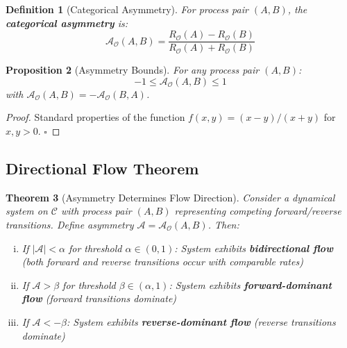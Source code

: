 \documentclass[12pt,a4paper]{article}
\newtheorem{theorem}{Theorem}[section]
\newtheorem{proposition}[theorem]{Proposition}
\newtheorem{definition}[theorem]{Definition}
\begin{document}
\begin{definition}[Categorical Asymmetry]
\label{def:asymmetry}
For process pair $(A, B)$, the \textbf{categorical asymmetry} is:
\begin{equation}
\mathcal{A}_{\mathcal{O}}(A, B) = \frac{R_{\mathcal{O}}(A) - R_{\mathcal{O}}(B)}{R_{\mathcal{O}}(A) + R_{\mathcal{O}}(B)}
\end{equation}
\end{definition}

\begin{proposition}[Asymmetry Bounds]
\label{prop:asymmetry_bounds}
For any process pair $(A, B)$:
\begin{equation}
-1 \leq \mathcal{A}_{\mathcal{O}}(A, B) \leq 1
\end{equation}
with $\mathcal{A}_{\mathcal{O}}(A, B) = -\mathcal{A}_{\mathcal{O}}(B, A)$.
\end{proposition}

\begin{proof}
Standard properties of the function $f(x, y) = (x-y)/(x+y)$ for $x, y > 0$. $\square$
\end{proof}

\subsection{Directional Flow Theorem}

\begin{theorem}[Asymmetry Determines Flow Direction]
\label{thm:asymmetry_flow}
Consider a dynamical system on $\mathcal{C}$ with process pair $(A, B)$ representing competing forward/reverse transitions. Define asymmetry $\mathcal{A} = \mathcal{A}_{\mathcal{O}}(A, B)$. Then:

\begin{enumerate}[(i)]
\item If $|\mathcal{A}| < \alpha$ for threshold $\alpha \in (0, 1)$: System exhibits \textbf{bidirectional flow} (both forward and reverse transitions occur with comparable rates)

\item If $\mathcal{A} > \beta$ for threshold $\beta \in (\alpha, 1)$: System exhibits \textbf{forward-dominant flow} (forward transitions dominate)

\item If $\mathcal{A} < -\beta$: System exhibits \textbf{reverse-dominant flow} (reverse transitions dominate)
\end{enumerate}
\end{theorem}
\end{document}
